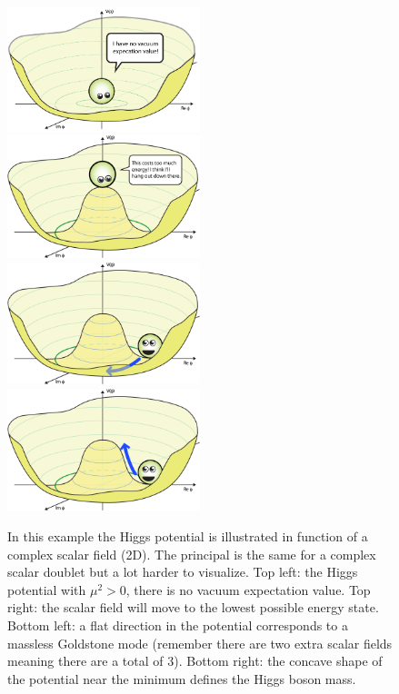 \begin{figure}
\includegraphics[width=0.5\textwidth]{chapter1/img/BoringPotential}
\includegraphics[width=0.5\textwidth]{chapter1/img/Higgs-Potential-lookdown}
\includegraphics[width=0.5\textwidth]{chapter1/img/Higgs-Potential-Goldstone}
\includegraphics[width=0.5\textwidth]{chapter1/img/Higgs-Potential-radial}
\caption{In this example the Higgs potential is illustrated in function of a complex scalar field (2D). The principal is the same for a complex scalar doublet but a lot harder to visualize. Top left: the Higgs potential with $\mu^2 > 0$, there is no vacuum expectation value. Top right: the scalar field will move to the lowest possible energy state. Bottom left: a flat direction in the potential corresponds to a massless Goldstone mode (remember there are two extra scalar fields meaning there are a total of 3). Bottom right: the concave shape of the potential near the minimum defines the Higgs boson mass.}
\label{fig:BEHpotential}
\end{figure}


